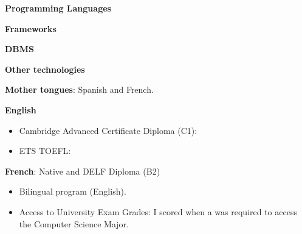 

\textbf{Programming Languages}
\medskip


\divider

\textbf{Frameworks}
\medskip


\divider

\textbf{DBMS}
\medskip


\divider

\textbf{Other technologies}
\medskip


\divider

\textbf{Mother tongues}: Spanish and French.

\divider

\textbf{English}
\medskip
\begin{itemize}
\item Cambridge Advanced Certificate Diploma (C1): 
\item ETS TOEFL: 
\end{itemize}

\divider

\textbf{French}: Native and DELF Diploma (B2)



\divider

\begin{itemize}
\item Bilingual program (English).
\item Access to University Exam Grades: I scored  when a  was required to access the Computer Science Major.
\end{itemize}

